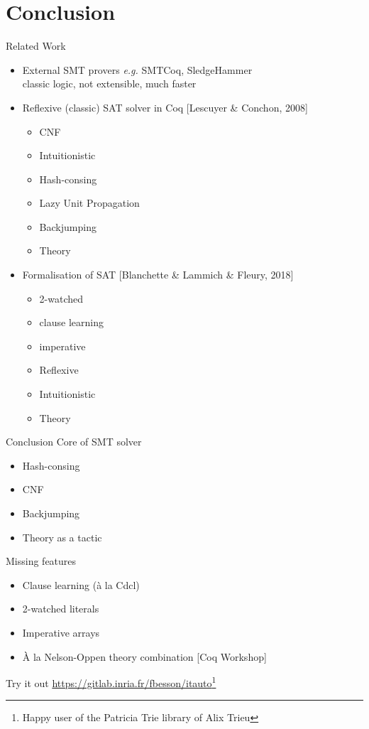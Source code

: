 \documentclass{beamer}
\newcommand{\xmark}{\ding{55}}%
\begin{document}
\section*{Conclusion}

\begin{frame}{Related Work}
  \begin{itemize}
  \item External SMT provers \emph{e.g.} SMTCoq, SledgeHammer\\
    classic logic, not extensible, much faster
  \item Reflexive (classic) SAT solver in Coq [Lescuyer \& Conchon, 2008]
    \begin{itemize}
    \item CNF \checkmark
    \item Intuitionistic \xmark
    \item Hash-consing \xmark
    \item Lazy Unit Propagation \xmark
    \item Backjumping \xmark
    \item Theory   \xmark
    \end{itemize}
  \item Formalisation of SAT [Blanchette \& Lammich \& Fleury, 2018]
    \begin{itemize}
    \item 2-watched \checkmark
    \item clause learning \checkmark
    \item imperative \checkmark
    \item Reflexive \xmark
    \item Intuitionistic \xmark
    \item Theory \xmark
    \end{itemize}
  \end{itemize}
  
\end{frame}

\begin{frame}{Conclusion}
  Core of SMT solver
  \begin{itemize}
  \item Hash-consing
  \item CNF
  \item Backjumping
  \item Theory as a tactic
  \end{itemize}
  Missing features
  \begin{itemize}
  \item Clause learning (à la Cdcl)
  \item 2-watched literals 
  \item Imperative arrays
  \item À la Nelson-Oppen theory combination [Coq Workshop] 
  \end{itemize}
  \bigskip
  Try it out \url{https://gitlab.inria.fr/fbesson/itauto}\footnote{Happy user of the Patricia Trie library of Alix Trieu}\\
\end{frame}
\end{document}
